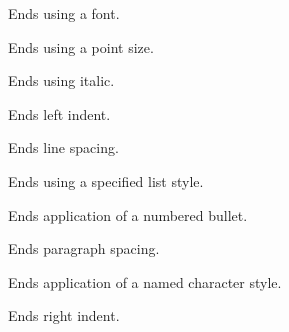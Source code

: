 Ends using a font.

\label{wxrichtextctrlendfontsize}


Ends using a point size.

\label{wxrichtextctrlenditalic}


Ends using italic.

\label{wxrichtextctrlendleftindent}


Ends left indent.

\label{wxrichtextctrlendlinespacing}


Ends line spacing.

\label{wxrichtextctrlendliststyle}


Ends using a specified list style.

\label{wxrichtextctrlendnumberedbullet}


Ends application of a numbered bullet.

\label{wxrichtextctrlendparagraphspacing}


Ends paragraph spacing.

\label{wxrichtextctrlendparagraphstyle}


Ends application of a named character style.

\label{wxrichtextctrlendrightindent}


Ends right indent.

\label{wxrichtextctrlendstyle}


